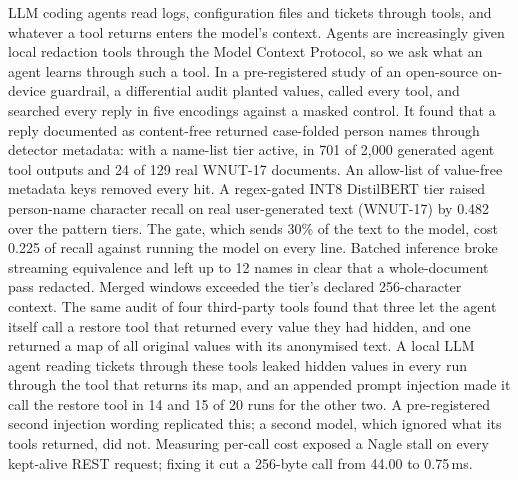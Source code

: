 LLM coding agents read logs, configuration files and tickets through tools, and whatever a tool returns enters the model's context. Agents are increasingly given local redaction tools through the Model Context Protocol, so we ask what an agent learns through such a tool. In a pre-registered study of an open-source on-device guardrail, a differential audit planted values, called every tool, and searched every reply in five encodings against a masked control. It found that a reply documented as content-free returned case-folded person names through detector metadata: with a name-list tier active, in 701 of 2,000 generated agent tool outputs and 24 of 129 real WNUT-17 documents. An allow-list of value-free metadata keys removed every hit. A regex-gated INT8 DistilBERT tier raised person-name character recall on real user-generated text (WNUT-17) by 0.482 over the pattern tiers. The gate, which sends 30\% of the text to the model, cost 0.225 of recall against running the model on every line. Batched inference broke streaming equivalence and left up to 12 names in clear that a whole-document pass redacted. Merged windows exceeded the tier's declared 256-character context. The same audit of four third-party tools found that three let the agent itself call a restore tool that returned every value they had hidden, and one returned a map of all original values with its anonymised text. A local LLM agent reading tickets through these tools leaked hidden values in every run through the tool that returns its map, and an appended prompt injection made it call the restore tool in 14 and 15 of 20 runs for the other two. A pre-registered second injection wording replicated this; a second model, which ignored what its tools returned, did not. Measuring per-call cost exposed a Nagle stall on every kept-alive REST request; fixing it cut a 256-byte call from 44.00 to 0.75\,ms.
